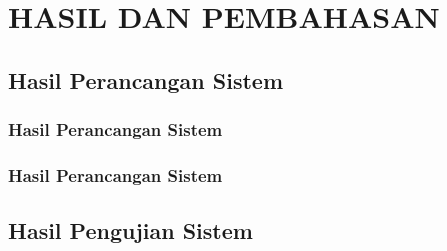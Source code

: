 \chapter{HASIL DAN PEMBAHASAN}
\section{Hasil Perancangan Sistem}

\vspace{1em}

\subsection{Hasil Perancangan Sistem}

\vspace{1em}

\subsection{Hasil Perancangan Sistem}

\vspace{1em}

\section{Hasil Pengujian Sistem}
